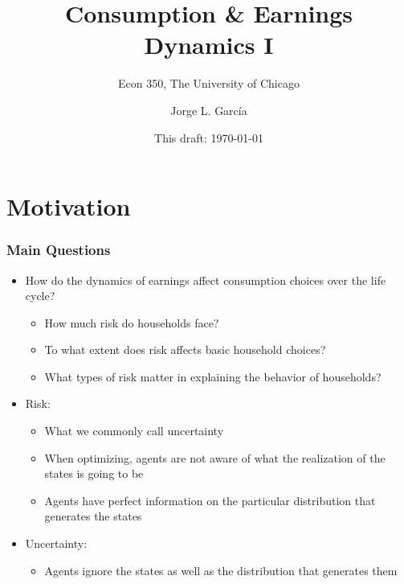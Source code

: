 

\title{Consumption \& Earnings Dynamics I}
\subtitle{Econ 350, The University of Chicago}
\author{Jorge L. Garc\'{i}a}
\date{This draft: \today}






\begin{frame}[plain]
	\titlepage
\end{frame}



\section{Motivation}

\begin{frame}
	\frametitle{Main Questions}
\begin{itemize}
	\item How do the dynamics of earnings affect consumption choices over the life cycle?
		\begin{itemize}
			\item How much risk do households face?
			\item To what extent does risk affects basic household choices?
			\item What types of risk matter in explaining the behavior of households?		
		\end{itemize}
	\item Risk:
			\begin{itemize}
				\item What we commonly call uncertainty
				\item When optimizing, agents are not aware of what the realization of the states is going to be
				\item Agents have perfect information on the particular distribution that generates the states
			\end{itemize}
	\item Uncertainty:
			\begin{itemize}
				\item Agents ignore the states as well as the distribution that generates them
			\end{itemize}
\end{itemize}
\end{frame}

